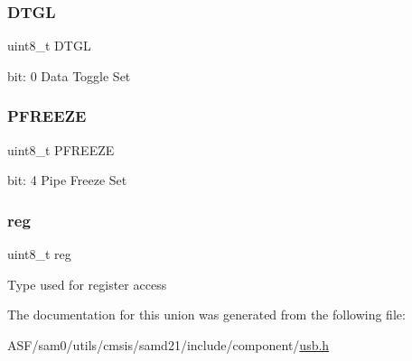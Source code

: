 \subsubsection{\texorpdfstring{DTGL}{DTGL}}
{\footnotesize\ttfamily uint8\+\_\+t D\+T\+GL}

bit\+: 0 Data Toggle Set \mbox{\label{union_u_s_b___h_o_s_t___p_s_t_a_t_u_s_s_e_t___type_a5e5a7a11855be531dd9c6eddc438572e}} 
\subsubsection{\texorpdfstring{PFREEZE}{PFREEZE}}
{\footnotesize\ttfamily uint8\+\_\+t P\+F\+R\+E\+E\+ZE}

bit\+: 4 Pipe Freeze Set \mbox{\label{union_u_s_b___h_o_s_t___p_s_t_a_t_u_s_s_e_t___type_a9428adc9af4653a2050e2536b55dec8d}} 
\subsubsection{\texorpdfstring{reg}{reg}}
{\footnotesize\ttfamily uint8\+\_\+t reg}

Type used for register access 

The documentation for this union was generated from the following file\+:\begin{DoxyCompactItemize}
\item 
A\+S\+F/sam0/utils/cmsis/samd21/include/component/\mbox{\hyperlink{component_2usb_8h}{usb.\+h}}\end{DoxyCompactItemize}

